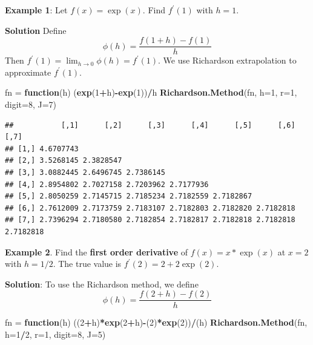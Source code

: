 \documentclass[
]{book}
\newenvironment{Shaded}{\begin{snugshade}}{\end{snugshade}}
\newcommand{\AttributeTok}[1]{\textcolor[rgb]{0.13,0.29,0.53}{#1}}
\newcommand{\ControlFlowTok}[1]{\textcolor[rgb]{0.13,0.29,0.53}{\textbf{#1}}}
\newcommand{\DecValTok}[1]{\textcolor[rgb]{0.00,0.00,0.81}{#1}}
\newcommand{\FunctionTok}[1]{\textcolor[rgb]{0.13,0.29,0.53}{\textbf{#1}}}
\newcommand{\NormalTok}[1]{#1}
\newcommand{\OtherTok}[1]{\textcolor[rgb]{0.56,0.35,0.01}{#1}}
\newcommand{\SpecialCharTok}[1]{\textcolor[rgb]{0.81,0.36,0.00}{\textbf{#1}}}
\begin{document}
\textbf{Example 1}: Let \(f(x) = \exp(x)\). Find \(f^\prime(1)\) with \(h =1\).

\textbf{Solution} Define
\[
\phi(h) = \frac{f(1+h) - f(1)}{h} 
\]
Then \(f^\prime(1) = \lim_{h \to 0} \phi(h) = f^\prime(1)\). We use Richardson extrapolation to approximate \(f^\prime(1)\).

\begin{Shaded}
\begin{Highlighting}[]
\NormalTok{fn }\OtherTok{=} \ControlFlowTok{function}\NormalTok{(h) (}\FunctionTok{exp}\NormalTok{(}\DecValTok{1}\SpecialCharTok{+}\NormalTok{h)}\SpecialCharTok{{-}}\FunctionTok{exp}\NormalTok{(}\DecValTok{1}\NormalTok{))}\SpecialCharTok{/}\NormalTok{h}
\FunctionTok{Richardson.Method}\NormalTok{(fn, }\AttributeTok{h=}\DecValTok{1}\NormalTok{, }\AttributeTok{r=}\DecValTok{1}\NormalTok{, }\AttributeTok{digit=}\DecValTok{8}\NormalTok{, }\AttributeTok{J=}\DecValTok{7}\NormalTok{)}
\end{Highlighting}
\end{Shaded}

\begin{verbatim}
##           [,1]      [,2]      [,3]      [,4]      [,5]      [,6]      [,7]
## [1,] 4.6707743                                                            
## [2,] 3.5268145 2.3828547                                                  
## [3,] 3.0882445 2.6496745 2.7386145                                        
## [4,] 2.8954802 2.7027158 2.7203962 2.7177936                              
## [5,] 2.8050259 2.7145715 2.7185234 2.7182559 2.7182867                    
## [6,] 2.7612009 2.7173759 2.7183107 2.7182803 2.7182820 2.7182818          
## [7,] 2.7396294 2.7180580 2.7182854 2.7182817 2.7182818 2.7182818 2.7182818
\end{verbatim}

\textbf{Example 2}. Find the \textbf{first order derivative} of \(f(x) = x*\exp(x)\) at \(x =2\) with \(h = 1/2\). The true value is \(f^\prime(2) = 2+2\exp(2)\).

\textbf{Solution}: To use the Richardson method, we define
\[
\phi(h) = \frac{f(2+h) - f(2)}{h}
\]

\begin{Shaded}
\begin{Highlighting}[]
\NormalTok{fn }\OtherTok{=} \ControlFlowTok{function}\NormalTok{(h) ((}\DecValTok{2}\SpecialCharTok{+}\NormalTok{h)}\SpecialCharTok{*}\FunctionTok{exp}\NormalTok{(}\DecValTok{2}\SpecialCharTok{+}\NormalTok{h)}\SpecialCharTok{{-}}\NormalTok{(}\DecValTok{2}\NormalTok{)}\SpecialCharTok{*}\FunctionTok{exp}\NormalTok{(}\DecValTok{2}\NormalTok{))}\SpecialCharTok{/}\NormalTok{(h) }
\FunctionTok{Richardson.Method}\NormalTok{(fn, }\AttributeTok{h=}\DecValTok{1}\SpecialCharTok{/}\DecValTok{2}\NormalTok{, }\AttributeTok{r=}\DecValTok{1}\NormalTok{, }\AttributeTok{digit=}\DecValTok{8}\NormalTok{, }\AttributeTok{J=}\DecValTok{5}\NormalTok{)}
\end{Highlighting}
\end{Shaded}
\end{document}
